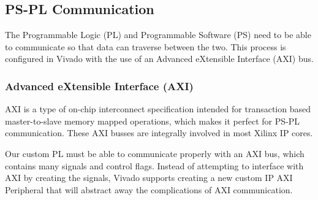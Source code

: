 \subsection{PS-PL Communication}
\label{sssec:ps_pl}
The Programmable Logic (PL) and Programmable Software (PS) need to be able to communicate so that data can traverse between the two. This process is configured in Vivado with the use of an Advanced eXtensible Interface (AXI) bus.

\subsubsection{Advanced eXtensible Interface (AXI)}
AXI is a type of on-chip interconnect specification intended for transaction based master-to-slave memory mapped operations, which makes it perfect for PS-PL communication. These AXI busses are integrally involved in most Xilinx IP cores.
\par
Our custom PL must be able to communicate properly with an AXI bus, which contains many signals and control flags. Instead of attempting to interface with AXI by creating the signals, Vivado supports creating a new custom IP AXI Peripheral that will abstract away the complications of AXI communication.

